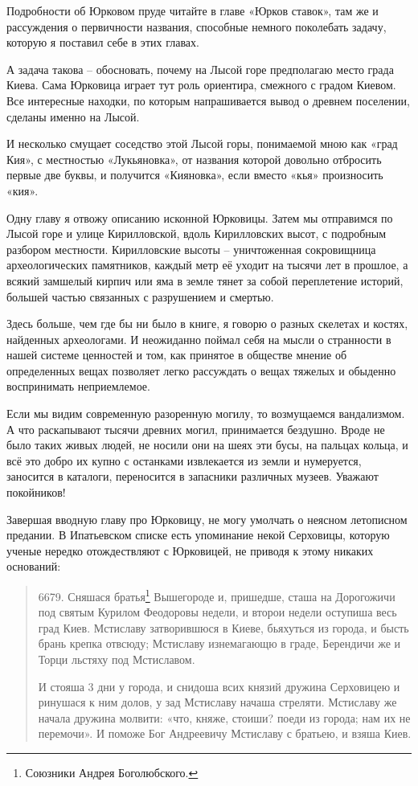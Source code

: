 Подробности об Юрковом пруде читайте в главе «Юрков ставок», там же и рассуждения о первичности названия, способные немного поколебать задачу, которую я поставил себе в этих главах.

А задача такова – обосновать, почему на Лысой горе предполагаю место града Киева. Сама Юрковица играет тут роль ориентира, смежного с градом Киевом. Все интересные находки, по которым напрашивается вывод о древнем поселении, сделаны именно на Лысой. 

И несколько смущает соседство этой Лысой горы, понимаемой мною как «град Кия», с местностью «Лукьяновка», от названия которой довольно отбросить первые две буквы, и получится «Кияновка», если вместо «кья» произносить «кия».

Одну главу я отвожу описанию исконной Юрковицы. Затем мы отправимся по Лысой горе и улице Кирилловской, вдоль Кирилловских высот, с подробным разбором местности. Кирилловские высоты – уничтоженная сокровищница археологических памятников, каждый метр её уходит на тысячи лет в прошлое, а всякий замшелый кирпич или яма в земле тянет за собой переплетение историй, большей частью связанных с разрушением и смертью.

Здесь больше, чем где бы ни было в книге, я говорю о разных скелетах и костях, найденных археологами. И неожиданно поймал себя на мысли о странности в нашей системе ценностей и том, как принятое в обществе мнение об определенных вещах позволяет легко рассуждать о вещах тяжелых и обыденно воспринимать неприемлемое.

Если мы видим современную разоренную могилу, то возмущаемся вандализмом. А что раскапывают тысячи древних могил, принимается бездушно. Вроде не было таких живых людей, не носили они на шеях эти бусы, на пальцах кольца, и всё это добро их купно с останками извлекается из земли и нумеруется, заносится в каталоги, переносится в запасники различных музеев. Уважают покойников!

Завершая вводную главу про Юрковицу, не могу умолчать о неясном летописном предании. В Ипатьевском списке есть упоминание некой Серховицы, которую ученые нередко отождествляют с Юрковицей, не приводя к этому никаких оснований:

\begin{quotation}
6679. Сняшася братья\footnote{Союзники Андрея Боголюбского.} Вышегороде и, пришедше, сташа на Дорогожичи под святым Курилом Феодоровы недели, и второи недели оступиша весь град Киев. Мстиславу затворившюся в Киеве, бьяхуться из города, и бысть брань крепка отвсюду; Мстиславу изнемагающю в граде, Берендичи же и Торци льстяху под Мстиславом. 

И стояша 3 дни у города, и снидоша всих князий дружина Серховицею и ринушася к ним долов, у зад Мстиславу начаша стреляти. Мстиславу же начала дружина молвити: «что, княже, стоиши? поеди из города; нам их не перемочи». И поможе Бог Андреевичу Мстиславу с братьею, и взяша Киев.
\end{quotation}

